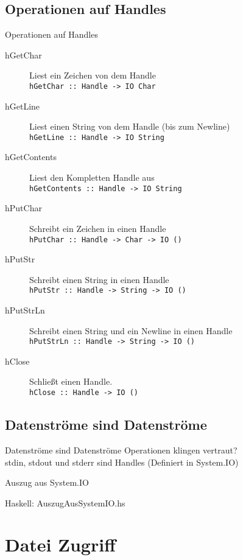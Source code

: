 \documentclass{beamer}
\newcommand{\code}[2]
{
	\begin{block}{#1: #2}
	
	\end{block}
}
\begin{document}
\subsection{Operationen auf Handles}
\begin{frame}[<+->]{Operationen auf Handles}
\begin{description}
\item[hGetChar] Liest ein Zeichen von dem Handle \\ \texttt{hGetChar :: Handle -> IO Char}
\item[hGetLine] Liest einen String von dem Handle (bis zum Newline) \\ \texttt{hGetLine :: Handle -> IO String}
\item[hGetContents] Liest den Kompletten Handle aus \\ \texttt{hGetContents :: Handle -> IO String}
\item[hPutChar] Schreibt ein Zeichen in einen Handle \\ \texttt{hPutChar :: Handle -> Char -> IO ()}
\item[hPutStr] Schreibt einen String in einen Handle \\ \texttt{hPutStr :: Handle -> String -> IO ()}
\item[hPutStrLn] Schreibt einen String und ein Newline in einen Handle\\ \texttt{hPutStrLn :: Handle -> String -> IO ()}
\item[hClose] Schließt einen Handle. \\ \texttt{hClose :: Handle -> IO ()}
\end{description}
\end{frame}

\subsection{Datenstr\"ome sind Datenstr\"ome}
\begin{frame}[<+->]{Datenstr\"ome sind Datenstr\"ome}
\center
Operationen klingen vertraut?\\
\pause
stdin, stdout und stderr sind Handles (Definiert in System.IO)\\
\end{frame}

\begin{frame}[fragile]{Auszug aus System.IO}
\tiny
\code{Haskell}{AuszugAusSystemIO.hs}
\end{frame}

\section{Datei Zugriff}
\end{document}
